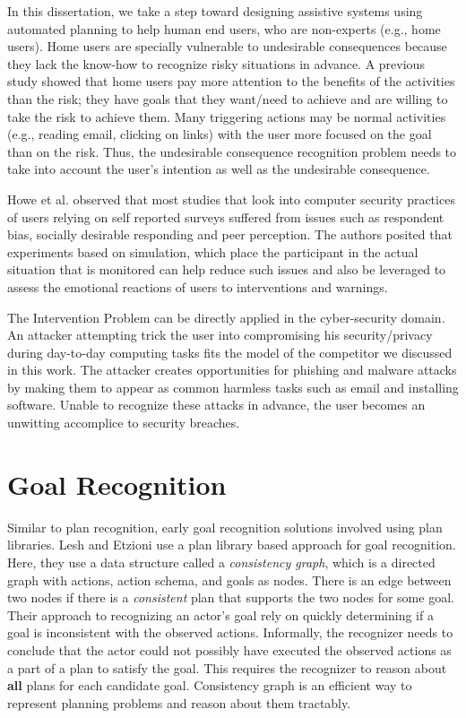 In this dissertation, we take a step toward designing assistive systems using automated planning to help human end users, who are non-experts (e.g., home users). 
Home users are specially vulnerable to undesirable consequences because they lack the know-how to recognize risky situations in advance.
A previous study \cite{byrne2016} showed that home users pay more attention to the benefits of the activities than the risk; they have goals that they want/need to achieve and are willing to take the risk to achieve them. Many triggering actions may be normal
activities (e.g., reading email, clicking on links) with the user more focused on the goal than on the risk. Thus, the undesirable consequence recognition problem needs to take into account the user’s intention as well as the undesirable consequence.

Howe et al. \citeyear{howe2012psychology} observed that most studies that look into computer security practices of users relying on self reported surveys suffered from issues such as respondent bias, socially desirable responding and peer perception.
The authors posited that experiments based on simulation, which place the participant in the actual situation that is monitored can help reduce such issues and also be leveraged to assess the emotional reactions of users to interventions and warnings.

The Intervention Problem can be directly applied in the cyber-security domain.
An attacker attempting trick the user into compromising his security/privacy during day-to-day computing tasks fits the model of the competitor we discussed in this work.
The attacker creates opportunities for phishing and malware attacks by making them to appear as common harmless tasks such as email and installing software. 
Unable to recognize these attacks in advance, the user becomes an unwitting accomplice to security breaches.


\section{Goal Recognition}
Similar to plan recognition, early goal recognition solutions involved using plan libraries. Lesh and Etzioni \citeyear{lesh1996} use a plan library based approach for goal recognition. Here, they use a data structure called a \textit{consistency graph}, which is a directed graph with actions, action schema, and goals as nodes. There is an edge between two nodes if there is a \textit{consistent} plan that supports the two nodes for some goal. Their approach to recognizing an actor's goal rely on quickly determining if a goal is inconsistent with the observed actions. Informally, the recognizer needs to conclude that the actor could not possibly have executed the observed actions as a part of a plan to satisfy the goal. This requires the recognizer to reason about \textbf{all} plans for each candidate goal. Consistency graph is an efficient way to represent planning problems and reason about them tractably.

